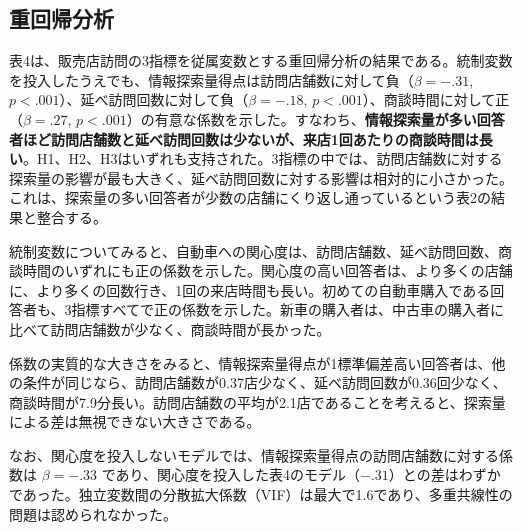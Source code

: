 \newpage
\subsection{重回帰分析}

表4は、販売店訪問の3指標を従属変数とする重回帰分析の結果である。統制変数を投入したうえでも、情報探索量得点は訪問店舗数に対して負（$\beta = -.31$, $p < .001$）、延べ訪問回数に対して負（$\beta = -.18$, $p < .001$）、商談時間に対して正（$\beta = .27$, $p < .001$）の有意な係数を示した。すなわち、\textbf{情報探索量が多い回答者ほど訪問店舗数と延べ訪問回数は少ないが、来店1回あたりの商談時間は長い}。H1、H2、H3はいずれも支持された。3指標の中では、訪問店舗数に対する探索量の影響が最も大きく、延べ訪問回数に対する影響は相対的に小さかった。これは、探索量の多い回答者が少数の店舗にくり返し通っているという表2の結果と整合する。

統制変数についてみると、自動車への関心度は、訪問店舗数、延べ訪問回数、商談時間のいずれにも正の係数を示した。関心度の高い回答者は、より多くの店舗に、より多くの回数行き、1回の来店時間も長い。初めての自動車購入である回答者も、3指標すべてで正の係数を示した。新車の購入者は、中古車の購入者に比べて訪問店舗数が少なく、商談時間が長かった。

係数の実質的な大きさをみると、情報探索量得点が1標準偏差高い回答者は、他の条件が同じなら、訪問店舗数が0.37店少なく、延べ訪問回数が0.36回少なく、商談時間が7.9分長い。訪問店舗数の平均が2.1店であることを考えると、探索量による差は無視できない大きさである。

なお、関心度を投入しないモデルでは、情報探索量得点の訪問店舗数に対する係数は $\beta = -.33$ であり、関心度を投入した表4のモデル（$-.31$）との差はわずかであった。独立変数間の分散拡大係数（VIF）は最大で1.6であり、多重共線性の問題は認められなかった。

